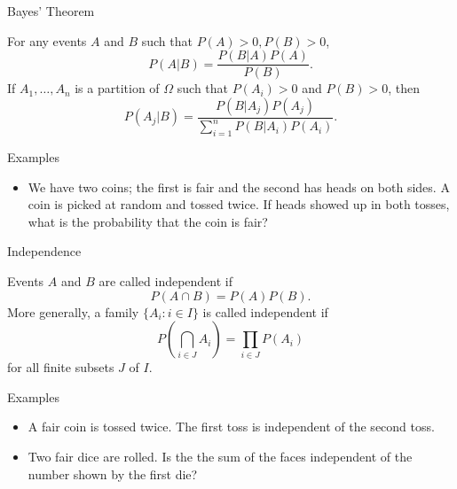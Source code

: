 \documentclass[t]{beamer}
\begin{document}
\begin{frame}{Bayes' Theorem}
  \footnotesize
  \pause
  \begin{theorem}[]
    For any events $A$ and $B$ such that $P(A) > 0, P(B) > 0$,
      \begin{equation*}
        P(A|B) = \frac{P(B|A)P(A)}{P(B)}.
      \end{equation*}
    \pause If $A_1, \ldots, A_n$ is a partition of $\Omega$ such that $P(A_i) > 0$ and $P(B) > 0$, then
      \begin{equation*}
        P(A_j|B) = \frac{P(B|A_j)P(A_j)}{\sum_{i=1}^nP(B|A_i)P(A_i)}.
      \end{equation*}
  \end{theorem}
  \pause
  \begin{block}{Examples}
    \begin{itemize}
      \item \pause We have two coins; the first is fair and the second has heads on both sides. A coin is picked at random and tossed twice. If heads showed up in both tosses, what is the probability that the coin is fair?
    \end{itemize}
  \end{block}
  \normalsize
\end{frame}

\begin{frame}{Independence}
  \footnotesize
  \pause
  \begin{definition}[]
    Events $A$ and $B$ are called independent if
      \begin{equation*}
        P(A \cap B) = P(A)P(B).
      \end{equation*}
    \pause More generally, a family $\{A_i: i \in I\}$ is called independent if
      \begin{equation*}
        P\left( \bigcap_{i \in J} A_i \right) = \prod_{i \in J} P(A_i)
      \end{equation*}
    for all finite subsets $J$ of $I$.
  \end{definition}
  \pause
  \begin{block}{Examples}
    \begin{itemize}
      \item \pause A fair coin is tossed twice. The first toss is independent of the second toss.
      \item \pause Two fair dice are rolled. Is the the sum of the faces independent of the number shown by the first die?
    \end{itemize}
  \end{block}
  \normalsize
\end{frame}
\end{document}
